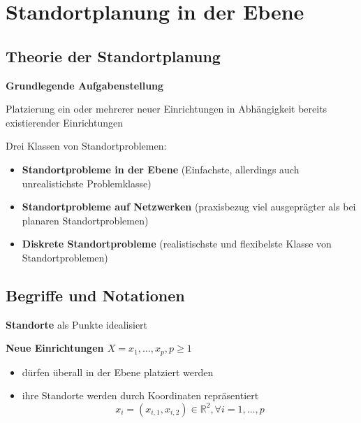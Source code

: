 \chapter{Standortplanung in der Ebene} %
\label{cha:standortplanung_in_der_ebene}

  \section{Theorie der Standortplanung} %
  \label{sec:theorie_der_standortplanung}

    \par \textbf{Grundlegende Aufgabenstellung}
    \par Platzierung ein oder mehrerer neuer Einrichtungen in Abhängigkeit bereits existierender Einrichtungen

    \par Drei Klassen von Standortproblemen:
    \begin{itemize}
      \item \textbf{Standortprobleme in der Ebene} (Einfachste, allerdings auch unrealistichste Problemklasse)
      \item \textbf{Standortprobleme auf Netzwerken} (praxisbezug viel ausgeprägter als bei planaren Standortproblemen)
      \item \textbf{Diskrete Standortprobleme} (realistischste und flexibelste Klasse von Standortproblemen)
    \end{itemize}
  

  \section{Begriffe und Notationen} %
  \label{sec:begriffe_und_symbole}

    \begin{defn}
      \textbf{Standorte}
      als Punkte idealisiert
    \end{defn}

    \begin{defn}
      \textbf{Neue Einrichtungen $X = {x_1, \dots, x_p}, p \geq 1$}
      \begin{itemize}
        \item dürfen überall in der Ebene platziert werden
        \item ihre Standorte werden durch Koordinaten repräsentiert
        \[ x_i = (x_{i, 1}, x_{i, 2}) \in \mathbb{R}^{2}, \forall i = 1, \dots, p\]
      \end{itemize}
    \end{defn}

